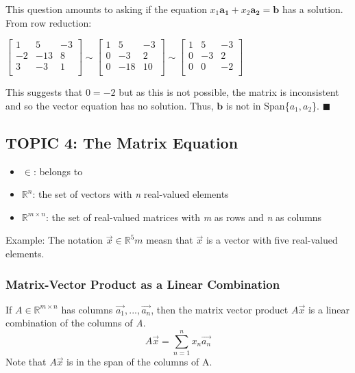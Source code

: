 \documentclass[12pt]{article} %
\newcommand{\R}{\mathbb{R}}
\begin{document}
This question amounts to asking if the equation $x_1\mathbf{a_1} + x_2\mathbf{a_2} = \mathbf{b}$ has a solution. From row reduction:
\begin{center}
	$\begin{bmatrix}
		1 & 5 & -3\\
		-2 & -13 & 8\\
		3 & -3 & 1\\
	\end{bmatrix}
	\sim
	\begin{bmatrix}
		1 & 5 & -3\\
		0 & -3 & 2\\
		0 & -18 & 10\\
	\end{bmatrix}
	\sim
	\begin{bmatrix}
		1 & 5 & -3\\
		0 & -3 & 2\\
		0 & 0 & -2\\
	\end{bmatrix}$
\end{center}
This suggests that $0 = -2$ but as this is not possible, the matrix is inconsistent and so the vector equation has no solution. Thus, $\mathbf{b}$ is not in Span\{\textbf{$a_1, a_2$}\}. $\blacksquare$



\pagebreak
\subsection{TOPIC 4: The Matrix Equation}
\begin{itemize}
\item $\in$: \indent belongs to \\
\item $\R^n$: \indent the set of vectors with \emph{n} real-valued elements\\
\item $\R^{m\times n}$: \indent the set of real-valued matrices with \emph{m} as rows and \emph{n} as columns\\
\end{itemize}
Example:
The notation $\vec{x} \in \R^5 m$ measn that $\vec{x}$ is a vector with five real-valued elements.\\

\subsubsection{Matrix-Vector Product as a Linear Combination}
If $A \in \R^{m\times n}$ has columns $\vec{a_1}, ..., \vec{a_n}$, then the matrix vector product $A\vec{x}$ is a linear combination of the columns of \emph{A}. 
$$A\vec{x} = \sum_{n=1}^n x_n \vec{a_n}$$
Note that $A\vec{x}$ is in the span of the columns of A.\\
\end{document}
